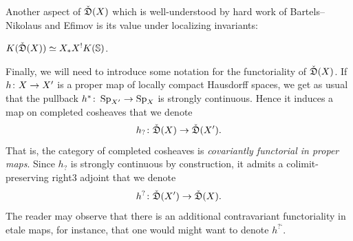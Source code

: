 Another aspect of $\check{\mathfrak{D}} (X )$ which is well-understood by hard work of Bartels--Nikolaus and Efimov is its value under localizing invariants:
\begin{thm}\label{thm: K theory of completed cosheaves}
  $K(\check{\mathfrak{D}} (X ))\simeq X_*X^!K (\mathbb{S} )$.
\end{thm}
Finally, we will need to introduce some notation for the functoriality of $\check{\mathfrak{D}} (X )$. If $h\colon X\to X '$ is a proper map of locally compact Hausdorff spaces, we get as usual that the pullback $h^*\colon\operatorname{Sp}_{X '}\to \operatorname{Sp}_{X}$ is strongly continuous. Hence it induces a map on completed cosheaves that we denote
\[
h_?\colon \check{\mathfrak{D}} (X )\to \check{\mathfrak{D}} (X ').
\]
That is, the category of completed cosheaves is {\em covariantly functorial in proper maps}. Since $h_?$ is strongly continuous by construction, it admits a colimit-preserving right3 adjoint that we denote
\[
h^?\colon \check{\mathfrak{D}} (X ')\to \check{\mathfrak{D}} (X ).
\]
The reader may observe that there is an additional contravariant functoriality in etale maps, for instance, that one would might want to denote $h^{\text{?`}}$.


\medskip

